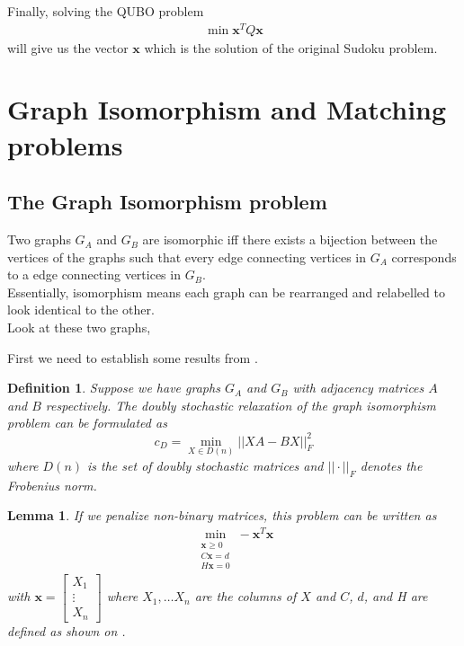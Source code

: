 \documentclass{article}
\newtheorem{lem}[prop]{Lemma}
\newtheorem{defn}[prop]{Definition}
\begin{document}
\noindent Finally, solving the QUBO problem
\begin{align*}
    \min \mathbf{x}^T Q \mathbf{x}
\end{align*}
will give us the vector \(\mathbf{x}\) which is the solution of the original Sudoku problem.
 

\section{Graph Isomorphism and Matching problems}
\subsection{The Graph Isomorphism problem}
Two graphs \(G_A\) and \(G_B\) are isomorphic iff there exists a bijection between the vertices of the graphs such that every edge connecting vertices in \(G_A\) corresponds to a edge connecting vertices in \(G_B\). \\
Essentially, isomorphism means each graph can be rearranged and relabelled to look identical to the other. \\

\noindent Look at these two graphs, 


\noindent First we need to establish some results from \autocite{klus2023continuous}.
\begin{defn}\label{def:1}
    \cite[p.~6]{klus2023continuous} Suppose we have graphs \(G_A\) and \(G_B\) with adjacency matrices \(A\) and \(B\) respectively. The doubly stochastic relaxation of the graph isomorphism problem can be formulated as
    \begin{equation*}
        c_D = \min_{X \in D(n)} ||XA - BX||^2_F
    \end{equation*}
    where \(D(n)\) is the set of doubly stochastic matrices and \(||\cdot||_F\) denotes the Frobenius norm.
\end{defn}

\begin{lem}
    \cite[p.~13]{klus2023continuous} If we penalize non-binary matrices, this problem can be written as \begin{align*}
    \min_{\substack{\mathbf{x}\geq 0 \\ C\mathbf{x} = d \\ H\mathbf{x} = 0}} -\mathbf{x}^T \mathbf{x}
    \end{align*}
    with \(\mathbf{x} = \begin{bmatrix}
        X_1 \\
        \vdots \\
        X_n
    \end{bmatrix}\) where \(X_1, \dots X_n\) are the columns of \(X\) and \(C\), \(d\), and H are defined as shown on \cite[p.~8]{klus2023continuous}.
\end{lem}
\end{document}
